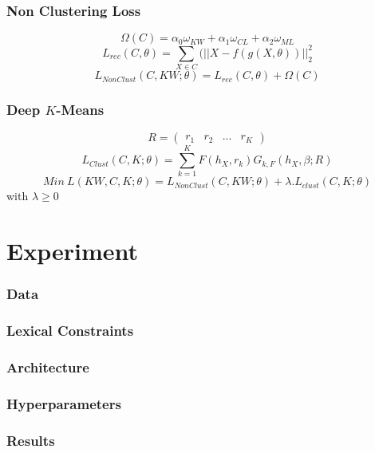 \documentclass{beamer}
\begin{document}
\begin{frame}
\frametitle{Non Clustering Loss}
\begin{equation*}\label{eq:Sparse}
  \Omega(C) = \alpha_0\omega_{KW} + \alpha_1\omega_{CL} + \alpha_2\omega_{ML}  
\end{equation*}
\pause
\begin{equation*}
  L_{rec}(C, \theta) = \sum_{X \in C}(||X - f(g(X, \theta))||_2^2
\end{equation*}
\pause
\begin{equation*}
  L_{NonClust}(C,KW; \theta) = L_{rec}(C, \theta) + \Omega(C)  
\end{equation*}

\end{frame}

\begin{frame}
\frametitle{Deep $K$-Means}
$$R = \begin{pmatrix} r_1 & r_2 & ... & r_K\end{pmatrix}$$
\pause
\begin{equation*}
  L_{Clust}(C, K; \theta) = \sum_{k=1}^K F(h_X, r_k) G_{k, F}(h_X, \beta; R) 
\end{equation*}
\pause
\begin{equation*}
  Min~L(KW, C, K; \theta) = L_{NonClust}(C, KW; \theta) + \lambda.L_{clust}(C,K;\theta)
\end{equation*}
with $\lambda \geq 0$
\end{frame}

\section{Experiment}

\begin{frame}
\frametitle{Data}
\end{frame}

\begin{frame}
\frametitle{Lexical Constraints}
\end{frame}

\begin{frame}
\frametitle{Architecture}
\end{frame}

\begin{frame}
\frametitle{Hyperparameters}
\end{frame}

\begin{frame}
\frametitle{Results}
\end{frame}
\end{document}
